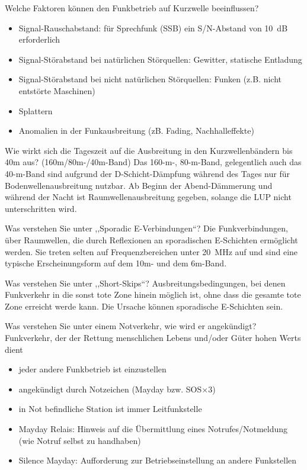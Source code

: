 \documentclass[avery5371,grid,frame,a4paper]{flashcards}
\newcommand{\card}[3]{
  \begin{flashcard}[{\chap} -- #1]{#2}#3\end{flashcard}
}
\begin{document}
\card{29}{Welche Faktoren können den Funkbetrieb auf Kurzwelle beeinflussen?}{
  \small
  \begin{itemize}
    \item Signal-Rauschabstand: für Sprechfunk (SSB) ein S/N-Abstand von 10~dB erforderlich
    \item Signal-Störabstand bei natürlichen Störquellen: Gewitter, statische Entladung
    \item Signal-Störabstand bei nicht natürlichen Störquellen: Funken (z.B. nicht entstörte Maschinen)
    \item Splattern
    \item Anomalien in der Funkausbreitung (zB. Fading, Nachhalleffekte)
  \end{itemize}
}
\card{30}{Wie wirkt sich die Tageszeit auf die Ausbreitung in den Kurzwellenbändern bis 40m aus? (160m/80m-/40m-Band)}{
  Das 160-m-, 80-m-Band, gelegentlich auch das 40-m-Band sind aufgrund der D-Schicht-Dämpfung während des Tages nur für Bodenwellenausbreitung nutzbar. Ab Beginn der Abend-Dämmerung und während der Nacht ist Raumwellenausbreitung gegeben, solange die LUP nicht unterschritten wird.
}
\card{31}{Was verstehen Sie unter ,,Sporadic E-Verbindungen``?}{
  Die Funkverbindungen, über Raumwellen, die durch Reflexionen an sporadischen E-Schichten ermöglicht werden. Sie treten selten auf Frequenzbereichen unter 20~MHz auf und sind eine typische Erscheinungsform auf dem 10m- und dem 6m-Band.
}
\card{32}{Was verstehen Sie unter ,,Short-Skips``?}{
  Ausbreitungsbedingungen, bei denen Funkverkehr in die sonst tote Zone hinein möglich ist, ohne dass die gesamte tote Zone erreicht werde kann. Die Ursache können sporadische E-Schichten sein.
}
\card{33}{Was verstehen Sie unter einem Notverkehr, wie wird er angekündigt?}{
  \small
  Funkverkehr, der der Rettung menschlichen Lebens und/oder Güter hohen Werts dient
  \begin{itemize}\itemsep1pt
    \item jeder andere Funkbetrieb ist einzustellen
    \item angekündigt durch Notzeichen {\footnotesize (Mayday bzw. SOS$\times 3$)}
    \item in Not befindliche Station ist immer Leitfunkstelle
    \item Mayday Relais: Hinweis auf die Übermittlung eines Notrufes/Notmeldung (wie Notruf selbst zu handhaben)
    \item Silence Mayday: Aufforderung zur Betriebseinstellung an andere Funkstellen
  \end{itemize}
}
\end{document}
